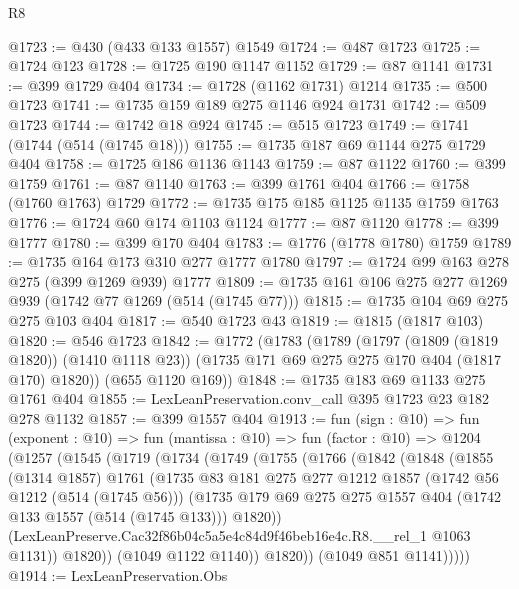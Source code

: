 \begin{lexlean}{R8}
\begin{coremodule}
@1723 := @430 (@433 @133 @1557) @1549
@1724 := @487 @1723
@1725 := @1724 @123
@1728 := @1725 @190 @1147 @1152
@1729 := @87 @1141
@1731 := @399 @1729 @404
@1734 := @1728 (@1162 @1731) @1214
@1735 := @500 @1723
@1741 := @1735 @159 @189 @275 @1146 @924 @1731
@1742 := @509 @1723
@1744 := @1742 @18 @924
@1745 := @515 @1723
@1749 := @1741 (@1744 (@514 (@1745 @18)))
@1755 := @1735 @187 @69 @1144 @275 @1729 @404
@1758 := @1725 @186 @1136 @1143
@1759 := @87 @1122
@1760 := @399 @1759
@1761 := @87 @1140
@1763 := @399 @1761 @404
@1766 := @1758 (@1760 @1763) @1729
@1772 := @1735 @175 @185 @1125 @1135 @1759 @1763
@1776 := @1724 @60 @174 @1103 @1124
@1777 := @87 @1120
@1778 := @399 @1777
@1780 := @399 @170 @404
@1783 := @1776 (@1778 @1780) @1759
@1789 := @1735 @164 @173 @310 @277 @1777 @1780
@1797 := @1724 @99 @163 @278 @275 (@399 @1269 @939) @1777
@1809 := @1735 @161 @106 @275 @277 @1269 @939 (@1742 @77 @1269 (@514 (@1745 @77)))
@1815 := @1735 @104 @69 @275 @275 @103 @404
@1817 := @540 @1723 @43
@1819 := @1815 (@1817 @103)
@1820 := @546 @1723
@1842 := @1772
    (@1783
      (@1789
        (@1797 (@1809 (@1819 @1820)) (@1410 @1118 @23))
        (@1735 @171 @69 @275 @275 @170 @404 (@1817 @170) @1820))
      (@655 @1120 @169))
@1848 := @1735 @183 @69 @1133 @275 @1761 @404
@1855 := LexLeanPreservation.conv_call @395 @1723 @23 @182 @278 @1132
@1857 := @399 @1557 @404
@1913 := fun (sign : @10) =>
  fun (exponent : @10) =>
  fun (mantissa : @10) =>
  fun (factor : @10) =>
  @1204
    (@1257
      (@1545
        (@1719
          (@1734
            (@1749
              (@1755
                (@1766
                  (@1842
                    (@1848
                      (@1855
                        (@1314 @1857)
                        @1761
                        (@1735
                          @83
                          @181
                          @275
                          @277
                          @1212
                          @1857
                          (@1742 @56 @1212 (@514 (@1745 @56)))
                          (@1735
                            @179
                            @69
                            @275
                            @275
                            @1557
                            @404
                            (@1742 @133 @1557 (@514 (@1745 @133)))
                            @1820))
                        (LexLeanPreserve.Cac32f86b04c5a5e4c84d9f46beb16e4c.R8.__rel_1 @1063 @1131))
                      @1820))
                  (@1049 @1122 @1140))
                @1820))
            (@1049 @851 @1141)))))
@1914 := LexLeanPreservation.Obs

\end{coremodule}
\end{lexlean}

